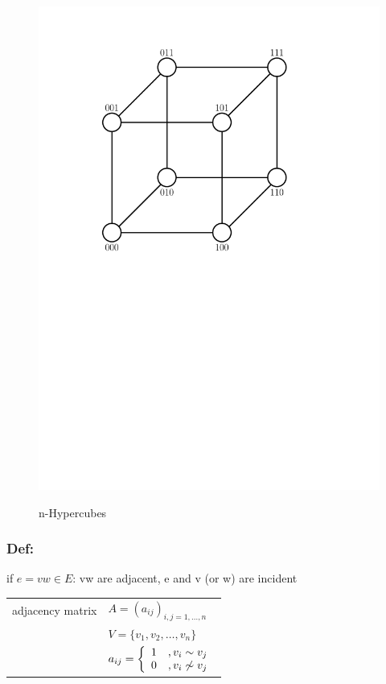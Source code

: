 \begin{figure}[htb]
{	\includegraphics[scale=.4]{01_graph_theory/pics/3D-cube.pdf}
}
\caption{n-Hypercubes}
\end{figure}
\FloatBarrier


\subsubsection*{Def:}
if $e = vw \in E$: vw are adjacent, e and v (or w) are incident

\begin{tabular}{l l}
adjacency matrix & $A = (a_{ij})_{i,j = 1, \ldots , n}$ \\
	& $ V = \{v_1, v_2, \ldots , v_n \} $ \\
	& $ a_{ij} = \left \{ \begin{array}{l l} 1 &, v_i \sim v_j  \\ 0 & , v_i \not\sim v_j \end{array} \right. $ \\

\end{tabular}


